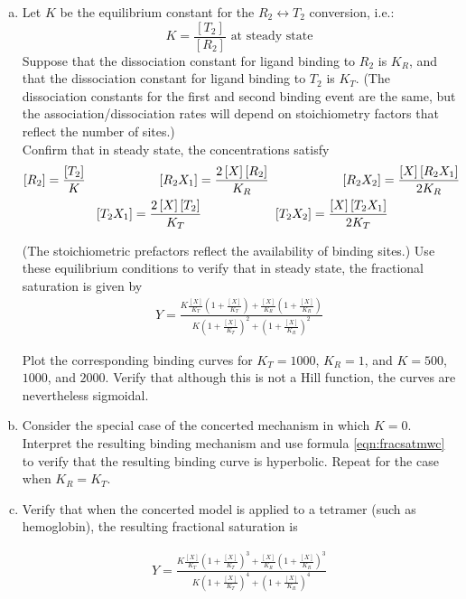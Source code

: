 \documentclass{article}
\begin{document}
\begin{enumerate}[a)]
\setlength{\itemsep}{0pt}
\item Let $K$ be the equilibrium constant for the $R_2 \leftrightarrow T_2$ conversion, i.e.:
\[  K = \frac{[T_2]}{[R_2]} \textrm{ at steady state} \]
Suppose that the dissociation constant for ligand binding to $R_2$ is $K_R$, and that the dissociation constant for ligand binding to $T_2$ is $K_T$. (The dissociation constants for the first and second binding event are the same, but the association/dissociation rates will depend on stoichiometry factors that reflect the number of sites.)\\

Confirm that in steady state, the concentrations satisfy
\begin{eqnarray*}
\left[ R_2 \right] = \frac{\left[ T_2 \right] }{K}  \hspace{ 2 cm} \left[ R_2X_1 \right] = \frac{2 \left[ X \right]  \left[ R_2 \right] }{K_R} \hspace{2 cm} \left[ R_2X_2 \right] = \frac{\left[ X \right]  \left[ R_2X_1 \right] }{2 K_R} \\
\left[ T_2X_1 \right] = \frac{2 \left[ X \right]  \left[ T_2 \right] }{K_T} \hspace{2 cm} \left[ T_2X_2 \right] = \frac{\left[ X \right]  \left[ T_2X_1 \right] }{2 K_T} \hspace{ 2 cm}
\end{eqnarray*}

(The stoichiometric prefactors reflect the availability of binding sites.) Use these equilibrium conditions to verify that in steady state, the fractional saturation is given by
\begin{eqnarray}
Y = \frac{K \frac{\left[ X \right]}{K_T} \left( 1 + \frac{\left[ X \right]}{K_T} \right) + \frac{\left[ X \right]}{K_R}  \left( 1 + \frac{\left[ X \right]}{K_R} \right) }{K \left( 1 + \frac{\left[ X \right]}{K_T}  \right)^2 + \left( 1 + \frac{\left[ X \right]}{K_R}  \right)^2} \label{eqn:fracsatmwc}
\end{eqnarray}

Plot the corresponding binding curves for $K_T = 1000$, $K_R = 1$, and $K = 500$, $1000$, and $2000$. Verify that although this is not a Hill function, the curves are nevertheless sigmoidal.
\item Consider the special case of the concerted mechanism in which $K=0$. Interpret the resulting binding mechanism and use formula \ref{eqn:fracsatmwc} to verify that the resulting binding curve is hyperbolic. Repeat for the case when $K_R = K_T$.
\item Verify that when the concerted model is applied to a tetramer (such as hemoglobin), the resulting fractional saturation is

\begin{eqnarray*}
Y = \frac{K \frac{\left[ X \right]}{K_T} \left( 1 + \frac{\left[ X \right]}{K_T} \right)^3 + \frac{\left[ X \right]}{K_R}  \left( 1 + \frac{\left[ X \right]}{K_R} \right)^3 }{K \left( 1 + \frac{\left[ X \right]}{K_T}  \right)^4 + \left( 1 + \frac{\left[ X \right]}{K_R}  \right)^4}
\end{eqnarray*}

\end{enumerate}
\end{document}

